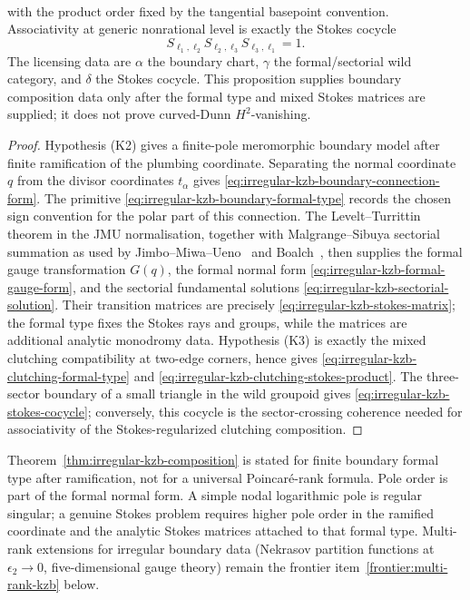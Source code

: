 \begin{proposition}
\begin{align}
\end{align}
with the product order fixed by the tangential basepoint convention.
Associativity at generic nonrational level is exactly the Stokes
cocycle
\begin{equation}
\label{eq:irregular-kzb-stokes-cocycle}
S_{\ell_{1},\ell_{2}}S_{\ell_{2},\ell_{3}}S_{\ell_{3},\ell_{1}}=1.
\end{equation}
The licensing data are \(\alpha\) the boundary chart,
\(\gamma\) the formal/sectorial wild category, and \(\delta\) the
Stokes cocycle. This proposition supplies boundary composition data
only after the formal type and mixed Stokes matrices are supplied; it
does not prove curved-Dunn \(H^{2}\)-vanishing.
\end{proposition}

\begin{proof}
Hypothesis \textup{(K2)} gives a finite-pole meromorphic boundary
model after finite ramification of the plumbing coordinate. Separating
the normal coordinate \(q\) from the divisor coordinates
\(t_{\alpha}\) gives
\eqref{eq:irregular-kzb-boundary-connection-form}. The primitive
\eqref{eq:irregular-kzb-boundary-formal-type} records the chosen sign
convention for the polar part of this connection. The
Levelt--Turrittin theorem in the JMU normalisation, together with
Malgrange--Sibuya sectorial summation as used by
Jimbo--Miwa--Ueno~\cite{JMU81} and Boalch~\cite{Boalch2001,Boalch2014},
then supplies the formal gauge transformation \(G(q)\), the formal
normal form \eqref{eq:irregular-kzb-formal-gauge-form}, and the
sectorial fundamental solutions
\eqref{eq:irregular-kzb-sectorial-solution}. Their transition
matrices are precisely \eqref{eq:irregular-kzb-stokes-matrix}; the
formal type fixes the Stokes rays and groups, while the matrices are
additional analytic monodromy data. Hypothesis \textup{(K3)} is
exactly the mixed clutching compatibility at two-edge corners, hence
gives \eqref{eq:irregular-kzb-clutching-formal-type} and
\eqref{eq:irregular-kzb-clutching-stokes-product}. The three-sector
boundary of a small triangle in the wild groupoid gives
\eqref{eq:irregular-kzb-stokes-cocycle}; conversely, this cocycle is
the sector-crossing coherence needed for associativity of the
Stokes-regularized clutching composition.
\end{proof}

\begin{remark}
\label{rem:poincare-rank-range}
Theorem~\ref{thm:irregular-kzb-composition} is stated for
finite boundary formal type after ramification, not for a universal
Poincar\'e-rank formula. Pole order is part of the formal normal form.
A simple nodal logarithmic pole is regular singular; a genuine Stokes
problem requires higher pole order in the ramified coordinate and the
analytic Stokes matrices attached to that formal type. Multi-rank
extensions for irregular boundary data (Nekrasov partition functions
at $\epsilon_2 \to 0$, five-dimensional gauge theory) remain the
frontier item~\ref{frontier:multi-rank-kzb} below.
\end{remark}

